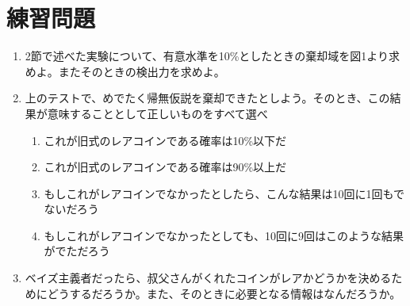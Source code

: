 \documentclass{jsarticle}
\begin{document}
\section*{練習問題}
\begin{enumerate}
 \item 2節で述べた実験について、有意水準を10\%としたときの棄却域を図1より求めよ。またそのときの検出力を求めよ。
 \item 上のテストで、めでたく帰無仮説を棄却できたとしよう。そのとき、この結果が意味することとして正しいものをすべて選べ
       \begin{enumerate}
	\item これが旧式のレアコインである確率は10\%以下だ
	\item これが旧式のレアコインである確率は90\%以上だ
	\item もしこれがレアコインでなかったとしたら、こんな結果は10回に1回もでないだろう
	\item もしこれがレアコインでなかったとしても、10回に9回はこのような結果がでただろう
       \end{enumerate}
 \item ベイズ主義者だったら、叔父さんがくれたコインがレアかどうかを決めるためにどうするだろうか。また、そのときに必要となる情報はなんだろうか。
\end{enumerate}
\end{document}
